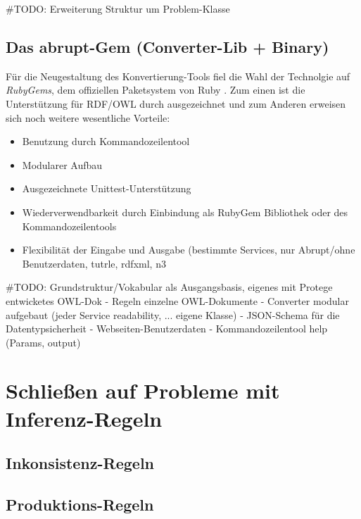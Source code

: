 \documentclass[runningheads,a4paper]{llncs}
\begin{document}
\#TODO: Erweiterung Struktur um Problem-Klasse

\subsection{Das abrupt-Gem (Converter-Lib + Binary)}
Für die Neugestaltung des Konvertierung-Tools fiel die Wahl der Technolgie auf \textit{RubyGems}, dem offiziellen Paketsystem von Ruby . 
Zum einen ist die Unterstützung für RDF/OWL durch \cite{ruby-rdf} ausgezeichnet und zum Anderen erweisen sich noch weitere wesentliche Vorteile:
\begin{itemize}
\item{Benutzung durch Kommandozeilentool}
\item{Modularer Aufbau}
\item{Ausgezeichnete Unittest-Unterstützung}
\item{Wiederverwendbarkeit durch Einbindung als RubyGem Bibliothek oder des Kommandozeilentools}
\item{Flexibilität der Eingabe und Ausgabe (bestimmte Services, nur Abrupt/ohne Benutzerdaten, tutrle, rdfxml, n3}
\end{itemize}

\#TODO: Grundstruktur/Vokabular als Ausgangsbasis, eigenes mit Protege entwicketes OWL-Dok
- Regeln einzelne OWL-Dokumente
- Converter modular aufgebaut (jeder Service readability, ... eigene Klasse)
- JSON-Schema für die Datentypsicherheit
- Webseiten-Benutzerdaten
- Kommandozeilentool help (Params, output)

\newpage

\section{Schließen auf Probleme mit Inferenz-Regeln}
\subsection{Inkonsistenz-Regeln}



\subsection{Produktions-Regeln}


\end{document}
